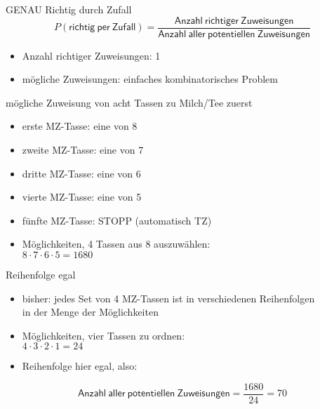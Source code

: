 \begin{frame}
  {GENAU Richtig durch Zufall}
  \begin{equation}
    P(\mathsf{richtig\ per\ Zufall})=\frac{\mathsf{Anzahl\ richtiger\ Zuweisungen}}{\mathsf{Anzahl\ aller\ potentiellen\ Zuweisungen}}
  \end{equation}
  \pause
  \begin{itemize}[<+->]
    \item Anzahl richtiger Zuweisungen: 1
    \item mögliche Zuweisungen: einfaches kombinatorisches Problem
  \end{itemize}
\end{frame}

\begin{frame}
  {mögliche Zuweisung von acht Tassen zu Milch\slash Tee zuerst}
  \begin{itemize}[<+->]
    \item erste MZ-Tasse: eine von 8
    \item zweite MZ-Tasse: eine von 7
    \item dritte MZ-Tasse: eine von 6
    \item vierte MZ-Tasse: eine von 5
    \item fünfte MZ-Tasse: STOPP (automatisch TZ)
    \item \alert{Möglichkeiten, 4 Tassen aus 8 auszuwählen:\\
      $8\cdot7\cdot6\cdot5=1680$}
  \end{itemize}
\end{frame}

\begin{frame}
  {Reihenfolge egal}
  \begin{itemize}[<+->]
    \item bisher: jedes Set von 4 MZ-Tassen ist in verschiedenen Reihenfolgen\\
      in der Menge der Möglichkeiten
    \item \alert{Möglichkeiten, vier Tassen zu ordnen:\\
      $4\cdot3\cdot2\cdot1=24$}
      \Zeile
    \item Reihenfolge hier egal, also:
  \end{itemize}
  \pause
  \begin{equation}
    \mathsf{Anzahl\ aller\ potentiellen\ Zuweisungen}=\frac{1680}{24}=70
  \end{equation}
\end{frame}

